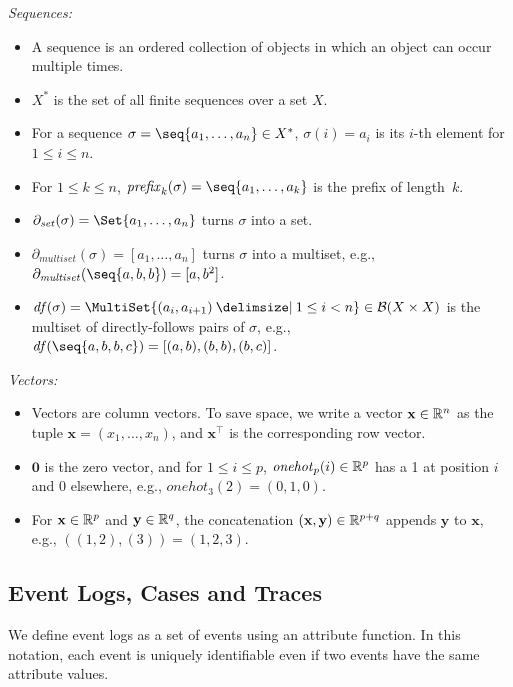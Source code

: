 \noindent\emph{Sequences:}
\begin{itemize}[beginpenalty=10000]
	\item A sequence is an ordered collection of objects in which an object can occur multiple times.
	\item $X^*$ is the set of all finite sequences over a set $X$.
	\item For a sequence $\sigma = \seq{a_1, \dots, a_n} \in X^*$, $\sigma(i) = a_i$ is its $i$-th element for $1 \le i \le n$.
	\item For $1 \le k \le n$, $\mathit{prefix}_k(\sigma) = \seq{a_1, \dots, a_k}$ is the prefix of length~$k$.
	\item $\partial_{\mathit{set}}(\sigma) = \Set{a_1, \dots, a_n}$ turns $\sigma$ into a set.
	\item $\partial_{\mathit{multiset}}(\sigma) = [a_1, \dots, a_n]$ turns $\sigma$ into a multiset, e.g., $\partial_{\mathit{multiset}}(\seq{a, b, b}) = [a, b^2]$.
	\item $\mathit{df}(\sigma) = \MultiSet{(a_i, a_{i+1}) \given 1 \le i < n} \in \mathcal{B}(X \times X)$ is the multiset of directly-follows pairs of $\sigma$, e.g., $\mathit{df}(\seq{a, b, b, c}) = [(a, b), (b, b), (b, c)]$.
\end{itemize}

\noindent\emph{Vectors:}
\begin{itemize}[beginpenalty=10000]
	\item Vectors are column vectors. To save space, we write a vector $\mathbf{x} \in \mathbb R^n$ as the tuple $\mathbf{x} = (x_1, \dots, x_n)$, and $\mathbf{x}^\top$ is the corresponding row vector.
	\item $\mathbf{0}$ is the zero vector, and for $1 \le i \le p$, $\mathit{onehot}_p(i) \in \mathbb R^p$ has a 1 at position $i$ and 0 elsewhere, e.g., $\mathit{onehot}_3(2) = (0, 1, 0)$.
	\item For $\mathbf{x} \in \mathbb R^p$ and $\mathbf{y} \in \mathbb R^q$, the concatenation $(\mathbf{x}, \mathbf{y}) \in \mathbb R^{p+q}$ appends $\mathbf{y}$ to $\mathbf{x}$, e.g., $((1, 2), (3)) = (1, 2, 3)$.
\end{itemize}


\subsection{Event Logs, Cases and Traces}
\label{sec:prelim:logs}
We define event logs as a set of events using an attribute function. In this notation, each event is uniquely identifiable even if two events have the same attribute values.

